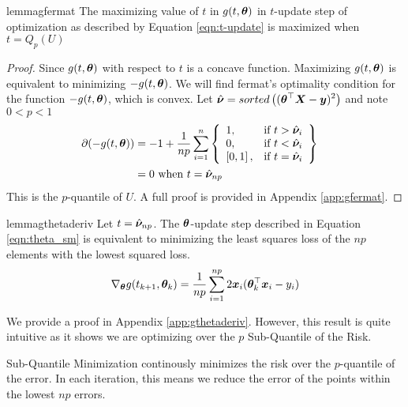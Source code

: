 \documentclass{article} %
\begin{document}
	\begin{restatable}{lemma}{gfermat}
		\label{lem:gfermat}
		The maximizing value of $t$ in $g(t,{\bm{\theta}})$ in $t$-update step of optimization as described by Equation \ref{eqn:t-update} is maximized when $t = Q_p(U)$
	\end{restatable}
		\begin{proof}
		Since $\displaystyle g(t,{\bm{\theta}})$ with respect to $t$ is a concave function. Maximizing $g(t,{\bm{\theta}})$ is equivalent to minimizing $-g(t,{\bm{\theta}})$. We will find fermat's optimality condition for the function $\displaystyle -g(t,{\bm{\theta}})$, which is convex. 
		Let $\displaystyle \hat{{\bm{\nu}}} = sorted\left(({\bm{\theta}}^\top{\bm{X}} - {\bm{y}})^2\right)$ and note $\displaystyle 0 < p < 1$
		\begin{align}
			\partial{\displaystyle (-g(t,\boldsymbol{\theta}})) 
			&= -1 + \frac{1}{np}\sum_{i=1}^{n}
			\left\{
			\begin{array}{lr}
				1, & \text{if } t > \hat{{\bm{\nu}}}_i\\
				0, & \text{if } t < \hat{{\bm{\nu}}}_i \\
				\left[0,1\right], & \text{if } t = \hat{{\bm{\nu}}}_i \\
			\end{array}
			\right\}&&\\
			&= 0 \text{ when }\displaystyle t = \hat{{\bm{\nu}}}_{np}&&
		\end{align}
		This is the $p$-quantile of $U$. A full proof is provided in Appendix \ref{app:gfermat}.
	\end{proof}
	
	\begin{restatable}{lemma}{gthetaderiv}\label{lem:gthetaderiv}
		Let $t = \hat{{\bm{\nu}}}_{np}$. The ${\bm{\theta}}$-update step described in Equation \ref{eqn:theta_sm} is equivalent to minimizing the least squares loss of the $np$ elements with the lowest squared loss.
	   \begin{equation}
			\nabla_{{\bm{\theta}}}g(t_{k+1},{\bm{\theta}}_k) = \frac{1}{np}\sum_{i=1}^{np}2{\bm{x}}_i({\bm{\theta}}_k^\top{\bm{x}}_i - y_i)
		\end{equation}
	\end{restatable}
	We provide a proof in Appendix \ref{app:gthetaderiv}. However, this result is quite intuitive as it shows we are optimizing over the $p$ Sub-Quantile of the Risk.
	\begin{interpretation}
		\label{int:minimize-small}
		Sub-Quantile Minimization continously minimizes the risk over the $p$-quantile of the error. In each iteration, this means we reduce the error of the points within the lowest $np$ errors.
	\end{interpretation}
\end{document}
